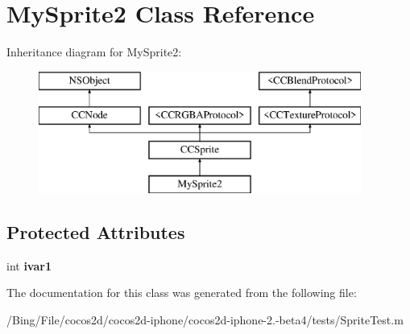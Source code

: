 \hypertarget{interface_my_sprite2}{\section{My\-Sprite2 Class Reference}
\label{interface_my_sprite2}
}
Inheritance diagram for My\-Sprite2\-:\begin{figure}[H]
\begin{center}
\leavevmode
\includegraphics[height=4.000000cm]{interface_my_sprite2}
\end{center}
\end{figure}
\subsection*{Protected Attributes}
\begin{DoxyCompactItemize}
\item 
\hypertarget{interface_my_sprite2_a684b2f86b7911cdbac43ce9e4afaa6a4}{int {\bfseries ivar1}}\label{interface_my_sprite2_a684b2f86b7911cdbac43ce9e4afaa6a4}

\end{DoxyCompactItemize}


The documentation for this class was generated from the following file\-:\begin{DoxyCompactItemize}
\item 
/\-Bing/\-File/cocos2d/cocos2d-\/iphone/cocos2d-\/iphone-\/2.-\/beta4/tests/Sprite\-Test.\-m\end{DoxyCompactItemize}
